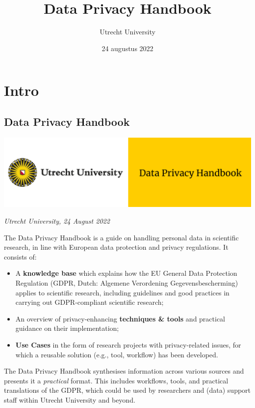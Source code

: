 \documentclass[
]{book}
\title{Data Privacy Handbook}
\author{Utrecht University}
\date{24 augustus 2022}
\providecommand{\tightlist}{%
  \setlength{\itemsep}{0pt}\setlength{\parskip}{0pt}}
\begin{document}
\maketitle

{
\setcounter{tocdepth}{1}
\tableofcontents
}
\hypertarget{part-intro}{%
\part*{Intro}\label{part-intro}}

\hypertarget{data-privacy-handbook}{%
\chapter*{Data Privacy Handbook}\label{data-privacy-handbook}}

\includegraphics{img/cover-image-dph.png}

\emph{Utrecht University, 24 August 2022}

The Data Privacy Handbook is a guide on handling personal data in scientific
research, in line with European data protection and privacy regulations. It
consists of:

\begin{itemize}
\tightlist
\item
  A \textbf{knowledge base} which explains how the EU General Data Protection
  Regulation (GDPR, Dutch: Algemene Verordening Gegevensbescherming) applies to
  scientific research, including guidelines and good practices in carrying out
  GDPR-compliant scientific research;
\item
  An overview of privacy-enhancing \textbf{techniques \& tools} and practical guidance
  on their implementation;
\item
  \textbf{Use Cases} in the form of research projects with privacy-related issues,
  for which a reusable solution (e.g., tool, workflow) has been developed.
\end{itemize}

The Data Privacy Handbook synthesises information across various sources and
presents it a \emph{practical} format. This includes workflows, tools, and practical
translations of the GDPR, which could be used by researchers and (data) support
staff within Utrecht University and beyond.
\end{document}
